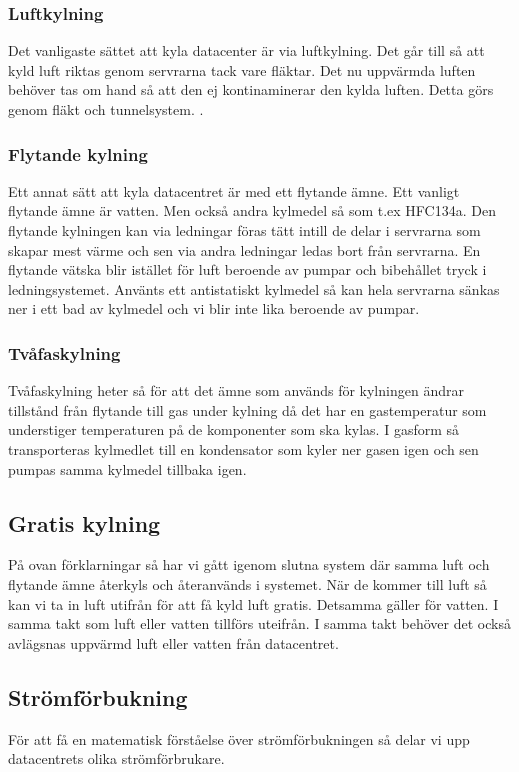 \documentclass[conference,a4paper]{IEEEtran}
\begin{document}
\subsubsection{Luftkylning}
Det vanligaste sättet att kyla datacenter är via luftkylning. Det går till så att kyld luft 
riktas genom servrarna tack vare fläktar. Det nu uppvärmda luften behöver tas om hand så att den ej kontinaminerar 
den kylda luften. Detta görs genom fläkt och tunnelsystem. \cite{modelling2}\cite{modelling1}.
\subsubsection{Flytande kylning}
Ett annat sätt att kyla datacentret är med ett flytande ämne. Ett vanligt flytande ämne är vatten. Men 
också andra kylmedel så som t.ex HFC134a. \cite{energycompare2} Den flytande kylningen kan via ledningar föras tätt intill de delar i servrarna som
skapar mest värme och sen via andra ledningar ledas bort från servrarna. En flytande vätska blir istället för luft beroende av pumpar och bibehållet tryck i ledningsystemet. 
Använts ett antistatiskt kylmedel så kan hela servrarna sänkas ner i ett bad av kylmedel och vi blir inte lika beroende av pumpar.   
\subsubsection{Tvåfaskylning}
Tvåfaskylning heter så för att det ämne som används för kylningen ändrar tillstånd från flytande till gas 
under kylning då det har en gastemperatur som understiger temperaturen på de komponenter som ska kylas. 
I gasform så transporteras kylmedlet till en kondensator som kyler ner gasen igen och sen pumpas samma kylmedel tillbaka igen. 
\subsection{Gratis kylning}
På ovan förklarningar så har vi gått igenom slutna system där samma luft och flytande ämne återkyls och återanvänds 
i systemet. När de kommer till luft så kan vi ta in luft utifrån för att få kyld luft gratis. Detsamma gäller för vatten. 
I samma takt som luft eller vatten tillförs uteifrån. I samma takt behöver det också avlägsnas uppvärmd luft eller 
vatten från datacentret. 
\subsection{Strömförbukning}
För att få en matematisk förståelse över strömförbukningen så delar vi upp datacentrets olika strömförbrukare. 
\end{document}
